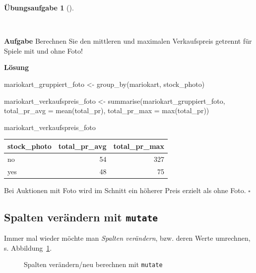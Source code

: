 \documentclass[
  letterpaper,
  twoside,
  open=any]{scrbook}
\newenvironment{Shaded}{\begin{snugshade}}{\end{snugshade}}
\newcommand{\AttributeTok}[1]{\textcolor[rgb]{0.40,0.45,0.13}{#1}}
\newcommand{\FunctionTok}[1]{\textcolor[rgb]{0.28,0.35,0.67}{#1}}
\newcommand{\NormalTok}[1]{\textcolor[rgb]{0.00,0.23,0.31}{#1}}
\newcommand{\OtherTok}[1]{\textcolor[rgb]{0.00,0.23,0.31}{#1}}
\theoremstyle{definition}
\theoremstyle{definition}
\newtheorem{exercise}{Übungsaufgabe}[chapter]
\theoremstyle{definition}
\theoremstyle{remark}
\begin{document}
\begin{exercise}[]\protect\hypertarget{exr-groupby}{}\label{exr-groupby}

~

\textbf{Aufgabe} Berechnen Sie den mittleren und maximalen Verkaufspreis
getrennt für Spiele mit und ohne Foto!

\textbf{Lösung}

\begin{Shaded}
\begin{Highlighting}[]
\NormalTok{mariokart\_gruppiert\_foto }\OtherTok{\textless{}{-}} \FunctionTok{group\_by}\NormalTok{(mariokart, stock\_photo)}

\NormalTok{mariokart\_verkaufspreis\_foto }\OtherTok{\textless{}{-}} 
  \FunctionTok{summarise}\NormalTok{(mariokart\_gruppiert\_foto,}
            \AttributeTok{total\_pr\_avg =} \FunctionTok{mean}\NormalTok{(total\_pr),}
            \AttributeTok{total\_pr\_max =} \FunctionTok{max}\NormalTok{(total\_pr))}

\NormalTok{mariokart\_verkaufspreis\_foto}
\end{Highlighting}
\end{Shaded}

\begin{longtable}[]{@{}lrr@{}}
\toprule\noalign{}
stock\_photo & total\_pr\_avg & total\_pr\_max \\
\midrule\noalign{}
\endhead
\bottomrule\noalign{}
\endlastfoot
no & 54 & 327 \\
yes & 48 & 75 \\
\end{longtable}

Bei Auktionen mit Foto wird im Schnitt ein höherer Preis erzielt als
ohne Foto. \(\square\)

\end{exercise}

\subsection{\texorpdfstring{Spalten verändern mit
\texttt{mutate}}{Spalten verändern mit mutate}}\label{spalten-veruxe4ndern-mit-mutate}

Immer mal wieder möchte man \emph{Spalten verändern}, bzw. deren Werte
umrechnen, s. Abbildung~\ref{fig-mutate}.

\begin{figure}


\caption{\label{fig-mutate}Spalten verändern/neu berechnen mit
\texttt{mutate}}

\end{figure}%
\end{document}
